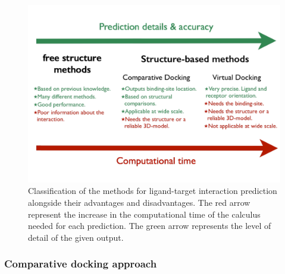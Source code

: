 \documentclass[12pt, b5paper,twoside]{tesi_upf}
\begin{document}
\begin{figure}[htbp]

  \centering
  	\includegraphics[width=\textwidth]{../figures/type_of_methods.pdf} %

	\caption[Type of computational methods for ligand-target interaction prediction]{Classification of the methods for ligand-target interaction prediction alongside their advantages and disadvantages. The red arrow represent the increase in the computational time of the calculus needed for each prediction. The green arrow represents the level of detail of the given output.}
	\label{fig:type_ligandtarget_methods}
\end{figure}
\subsubsection{Comparative docking approach}\label{comparative-docking}
\end{document}
